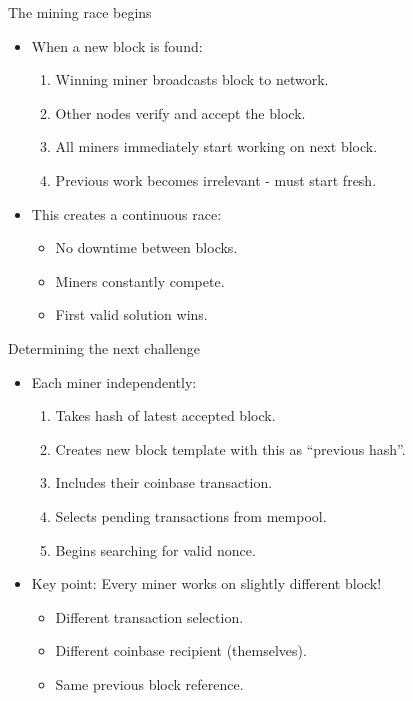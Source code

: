 \documentclass[aspectratio=169, lualatex, handout]{beamer}
\begin{document}
\begin{frame}{The mining race begins}
	\begin{itemize}
		\item When a new block is found:
		      \begin{enumerate}
			      \item Winning miner broadcasts block to network.
			      \item Other nodes verify and accept the block.
			      \item All miners immediately start working on next block.
			      \item Previous work becomes irrelevant - must start fresh.
		      \end{enumerate}
		\item This creates a continuous race:
		      \begin{itemize}
			      \item No downtime between blocks.
			      \item Miners constantly compete.
			      \item First valid solution wins.
		      \end{itemize}
	\end{itemize}
\end{frame}

\begin{frame}{Determining the next challenge}
	\begin{itemize}
		\item Each miner independently:
		      \begin{enumerate}
			      \item Takes hash of latest accepted block.
			      \item Creates new block template with this as ``previous hash''.
			      \item Includes their coinbase transaction.
			      \item Selects pending transactions from mempool.
			      \item Begins searching for valid nonce.
		      \end{enumerate}
		\item Key point: Every miner works on slightly different block!
		      \begin{itemize}
			      \item Different transaction selection.
			      \item Different coinbase recipient (themselves).
			      \item Same previous block reference.
		      \end{itemize}
	\end{itemize}
\end{frame}
\end{document}

